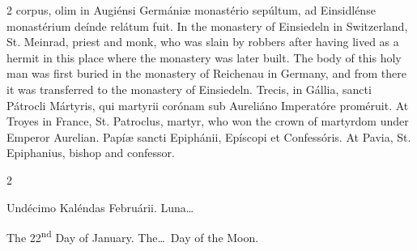 \begin{paracol}{2}
 corpus, olim in Augiénsi Germániæ monastério sepúltum, ad Einsidlénse 
 monastérium deínde relátum fuit.
\switchcolumn
{}
In the monastery of Einsiedeln in Switzerland, St. Meinrad, priest and monk, 
 who was slain by robbers after having lived as a hermit in this place where 
 the monastery was later built. The body of this holy man was first 
 buried in the monastery of Reichenau in Germany, and from there it was 
 transferred to the monastery of Einsiedeln.
\switchcolumn*
{}
Trecis, in Gállia, sancti Pátrocli Mártyris, qui martyrii corónam sub 
 Aureliáno Imperatóre proméruit.
\switchcolumn
{}
At Troyes in France, St. Patroclus, martyr, who won the crown of martyrdom 
 under Emperor Aurelian.
\switchcolumn*
{}
Papíæ sancti Epiphánii, Epíscopi et Confessóris.
\switchcolumn
{}
At Pavia, St. Epiphanius, bishop and confessor.
\switchcolumn*
{}
\end{paracol}


\begin{paracol}{2}
\begin{center}{\color{gregoriocolor} Undécimo Kaléndas Februárii. 
 Luna\dots\ }\end{center}
\switchcolumn
{}
\begin{center}{\color{gregoriocolor} The 22\textsuperscript{nd} Day of 
 January. The\dots\ Day of the Moon.}\end{center}
\end{paracol}

